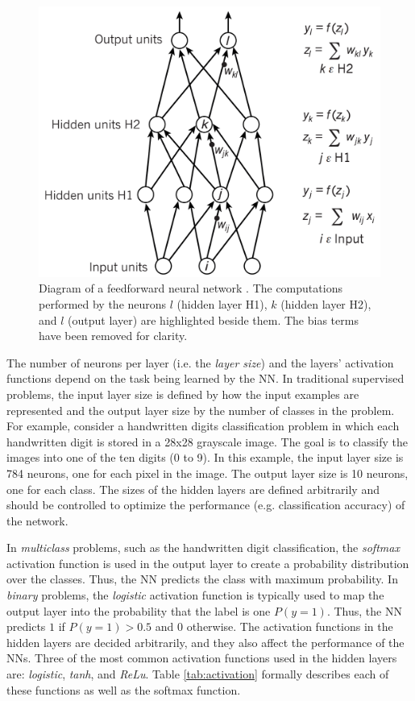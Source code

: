 \begin{figure}[!h]
\centering
\includegraphics[width=0.7\columnwidth]{imgs/background/ann.png}
\caption{Diagram of a feedforward neural network \cite{lecun2015deep}. The computations performed by the neurons $l$ (hidden layer H1), $k$ (hidden layer H2), and $l$ (output layer) are highlighted beside them. The bias terms have been removed for clarity.}
\label{fig:nn}
\end{figure}

The number of neurons per layer (i.e. the \textit{layer size}) and the layers' activation functions depend on the task being learned by the NN. In traditional supervised problems, the input layer size is defined by how the input examples are represented and the output layer size by the number of classes in the problem. For example, consider a handwritten digits classification problem in which each handwritten digit is stored in a 28x28 grayscale image. The goal is to classify the images into one of the ten digits (0 to 9). In this example, the input layer size is 784 neurons, one for each pixel in the image. The output layer size is 10 neurons, one for each class. The sizes of the hidden layers are defined arbitrarily and should be controlled to optimize the performance (e.g. classification accuracy) of the network.

In \textit{multiclass} problems, such as the handwritten digit classification, the \textit{softmax} activation function is used in the output layer to create a probability distribution over the classes. Thus, the NN predicts the class with maximum probability. In \textit{binary} problems, the \textit{logistic} activation function is typically used to map the output layer into the probability that the label is one $P(y = 1)$. Thus, the NN predicts $1$ if $P(y = 1) > 0.5$ and $0$ otherwise. The activation functions in the hidden layers are decided arbitrarily, and they also affect the performance of the NNs. Three of the most common activation functions used in the hidden layers are: \textit{logistic}, \textit{tanh}, and \textit{ReLu}. Table \ref{tab:activation} formally describes each of these functions as well as the softmax function.

